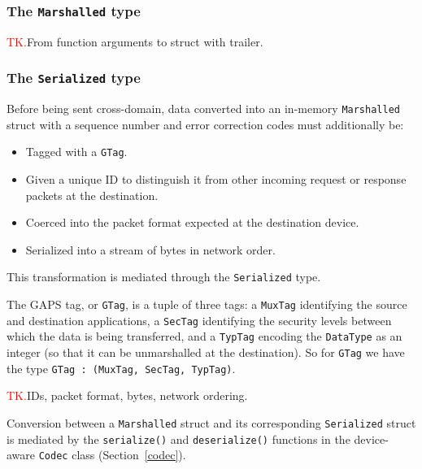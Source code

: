 \documentclass[11pt, oneside]{article}
\newcommand{\todo}{\textcolor{red}{TK.}}
\begin{document}
            \subsubsection{The \texttt{Marshalled} type}

                \todo From function arguments to struct with trailer.

            \subsubsection{The \texttt{Serialized} type}
            
                Before being sent cross-domain, data converted into an in-memory
                \texttt{Marshalled} struct with a sequence number and
                error correction codes must additionally be:
                \begin{itemize}
                    \item Tagged with a \texttt{GTag}.
                    \item Given a unique ID to distinguish it from other
                    incoming request or response packets at the destination.
                    \item Coerced into the packet format expected at the destination
                    device.
                    \item Serialized into a stream of bytes in network order.
                \end{itemize}

                This transformation is mediated through the \texttt{Serialized} type.
                
                The GAPS tag, or \texttt{GTag}, is a tuple of three tags: a \texttt{MuxTag}
                identifying the source and destination applications, a \texttt{SecTag} 
                identifying the security levels between which the data is being 
                transferred, and a \texttt{TypTag} encoding the \texttt{DataType} as
                an integer (so that it can be unmarshalled at the destination). So for
                \texttt{GTag} we have the type \texttt{GTag : (MuxTag, SecTag, TypTag)}.

                \todo IDs, packet format, bytes, network ordering.

                Conversion between a \texttt{Marshalled} struct and its corresponding 
                \texttt{Serialized} struct is mediated by the \texttt{serialize()}
                and \texttt{deserialize()} functions in the device-aware 
                \texttt{Codec} class (Section~\ref{codec}).
\end{document}
